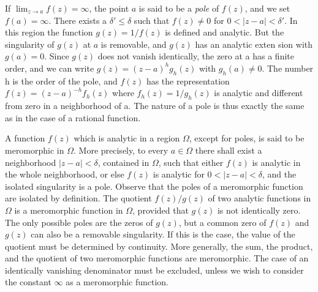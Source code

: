 If $\lim_{z\to a}f(z)=\infty$, the point $a$ is said to be a \textit{pole} of $f(z)$, and we set $f(a)=\infty$. There exists a $\delta' \leq \delta$ such that $f(z) \neq 0$ for $0 < |z - a| < \delta'$. In this region the function $g(z) = 1/f(z)$ is defined and analytic. But the singularity of $g(z)$ at $a$ is removable, and $g(z)$ has an analytic exten%
\begingroup\renewcommand{\thefootnote}{}\endgroup%
%
sion with $g(a) = 0$. Since $g(z)$ does not vanish identically, the zero at a has a finite order, and we can write $g(z) = (z - a)^{h}g_{h}(z)$ with $g_{h}(a) \neq 0$. The number h is the order of the pole, and $f(z)$ has the representation $f(z) = (z - a)^{-h}f_{h}(z)$ where $f_{h}(z) = 1/g_{h}(z)$ is analytic and different from zero in a neighborhood of a. The nature of a pole is thus exactly the same as in the case of a rational function.

A function $f(z)$ which is analytic in a region $\Omega$, except for poles, is said to be meromorphic in $\Omega$. More precisely, to every $a \in \Omega$ there shall exist a neighborhood $|z - a| < \delta$, contained in $\Omega$, such that either $f(z)$ is analytic in the whole neighborhood, or else $f(z)$ is analytic for $0 < |z - a| < \delta$, and the isolated singularity is a pole. Observe that the poles of a meromorphic function are isolated by definition. The quotient $f(z)/g(z)$ of two analytic functions in $\Omega$ is a meromorphic function in $\Omega$, provided that $g(z)$ is not identically zero. The only possible poles are the zeros of $g(z)$, but a common zero of $f(z)$ and $g(z)$ can also be a removable singularity. If this is the case, the value of the quotient must be determined by continuity. More generally, the sum, the product, and the quotient of two meromorphic functions are meromorphic. The case of an identically vanishing denominator must be excluded, unless we wish to consider the constant $\infty$ as a meromorphic function.

